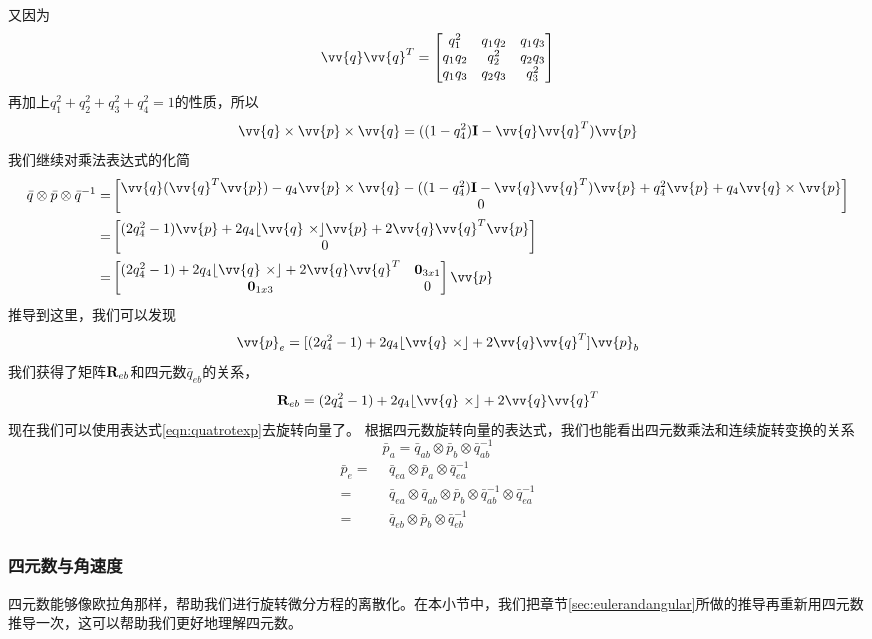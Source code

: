 \documentclass[11pt]{article}
\begin{document}
又因为
$$
\vv{q}\vv{q}^T = 
\begin{bmatrix}
q_1^2	&	q_1q_2		&	q_1q_3	\\
q_1q_2		&	q_2^2	&	q_2q_3	\\
q_1q_3		&	q_2q_3	&	q_3^2
\end{bmatrix}
$$
再加上$q_1^2+q_2^2+q_3^2+q_4^2 = 1$的性质，所以
$$
\vv{q}\times\vv{p}\times\vv{q} = ((1-q_4^2){\bf I} - \vv{q}\vv{q}^T)\vv{p}
$$
我们继续对乘法表达式的化简
\begin{align*}
\bar{q} \otimes \bar{p} \otimes \bar{q}^{-1} 
= & 
\begin{bmatrix}
\vv{q}(\vv{q}^T\vv{p}) - q_4\vv{p}\times\vv{q} - ((1-q_4^2){\bf I} - \vv{q}\vv{q}^T)\vv{p} + q_4^2\vv{p}+q_4\vv{q}\times\vv{p} \\
0  
\end{bmatrix} 
\\
= &
\begin{bmatrix}
(2q_4^2-1)\vv{p} + 2q_4\lfloor \vv{q} \ \times \rfloor \vv{p}  + 2\vv{q}\vv{q}^T\vv{p} \\
0  
\end{bmatrix} 
\\
= &
\begin{bmatrix}
(2q_4^2-1) + 2q_4\lfloor \vv{q} \ \times \rfloor   + 2\vv{q}\vv{q}^T & {\bf 0}_{3x1}\\
{\bf 0}_{1x3}  & 0
\end{bmatrix}\vv{p}
\end{align*}
推导到这里，我们可以发现
$$
\vv{p}_e = [(2q_4^2-1) + 2q_4\lfloor \vv{q} \ \times \rfloor   + 2\vv{q}\vv{q}^T]\vv{p}_b
$$
我们获得了矩阵${\bf R}_{eb}$和四元数$\bar{q}_{eb}$的关系，
$$
{\bf R}_{eb} = (2q_4^2-1) + 2q_4\lfloor \vv{q} \ \times \rfloor   + 2\vv{q}\vv{q}^T
$$
现在我们可以使用表达式\ref{eqn:quatrotexp}去旋转向量了。
根据四元数旋转向量的表达式，我们也能看出四元数乘法和连续旋转变换的关系
$$
\bar{p}_a = \bar{q}_{ab} \otimes \bar{p}_b \otimes \bar{q}^{-1}_{ab}
$$
\begin{align*}
\bar{p}_e = & \ \ \bar{q}_{ea} \otimes \bar{p}_a \otimes \bar{q}^{-1}_{ea}\\
		  = & \ \ \bar{q}_{ea} \otimes \bar{q}_{ab} \otimes \bar{p}_b \otimes \bar{q}^{-1}_{ab} \otimes \bar{q}^{-1}_{ea}\\
		  = & \ \ \bar{q}_{eb} \otimes \bar{p}_b \otimes \bar{q}^{-1}_{eb}
\end{align*}
\subsubsection{四元数与角速度}
四元数能够像欧拉角那样，帮助我们进行旋转微分方程的离散化。在本小节中，我们把章节\ref{sec:eulerandangular}所做的推导再重新用四元数推导一次，这可以帮助我们更好地理解四元数。
\end{document}
